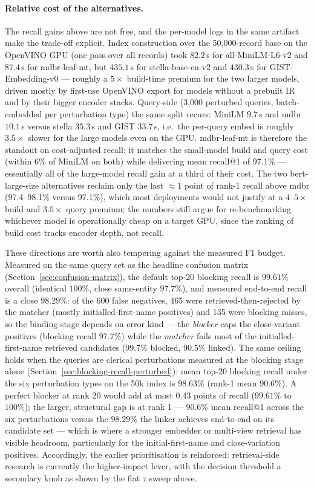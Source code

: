 \documentclass[11pt]{article}
\begin{document}
\paragraph{Relative cost of the alternatives.}
The recall gains above are not free, and the per-model logs in the same artifact make the trade-off explicit. Index construction over the 50{,}000-record base on the OpenVINO GPU (one pass over all records) took $82.2$\,s for all-MiniLM-L6-v2 and $87.4$\,s for mdbr-leaf-mt, but $435.1$\,s for stella-base-en-v2 and $430.3$\,s for GIST-Embedding-v0 --- roughly a $5\times$ build-time premium for the two larger models, driven mostly by first-use OpenVINO export for models without a prebuilt IR and by their bigger encoder stacks. Query-side (3,000 perturbed queries, batch-embedded per perturbation type) the same split recurs: MiniLM $9.7$\,s and mdbr $10.1$\,s versus stella $35.3$\,s and GIST $33.7$\,s, i.e.\ the per-query embed is roughly $3.5\times$ slower for the large models even on the GPU. mdbr-leaf-mt is therefore the standout on cost-adjusted recall: it matches the small-model build and query cost (within 6\% of MiniLM on both) while delivering mean recall@1 of 97.1\% --- essentially all of the large-model recall gain at a third of their cost. The two bert-large-size alternatives reclaim only the last $\approx 1$ point of rank-1 recall above mdbr (97.4--98.1\% versus 97.1\%), which most deployments would not justify at a $4\text{--}5\times$ build and $3.5\times$ query premium; the numbers still argue for re-benchmarking whichever model is operationally cheap on a target GPU, since the ranking of build cost tracks encoder depth, not recall.

These directions are worth also tempering against the measured F1 budget. Measured on the same query set as the headline confusion matrix (Section~\ref{sec:confusion-matrix}), the default top-20 blocking recall is $99.61\%$ overall (identical $100\%$, close same-entity $97.7\%$), and measured end-to-end recall is a close $98.29\%$: of the 600 false negatives, 465 were retrieved-then-rejected by the matcher (mostly initialled-first-name positives) and 135 were blocking misses, so the binding stage depends on error kind --- the \emph{blocker} caps the close-variant positives (blocking recall 97.7\%) while the \emph{matcher} fails most of the initialled-first-name retrieved candidates (99.7\% blocked, 90.5\% linked). The same ceiling holds when the queries are clerical perturbations measured at the blocking stage alone (Section~\ref{sec:blocking-recall-perturbed}): mean top-20 blocking recall under the six perturbation types on the 50k index is $98.63\%$ (rank-1 mean $90.6\%$). A perfect blocker at rank 20 would add at most $0.43$ points of recall ($99.61\%$ to $100\%$); the larger, structural gap is at rank 1 --- $90.6\%$ mean recall@1 across the six perturbations versus the $98.29\%$ the linker achieves end-to-end on its candidate set --- which is where a stronger embedder or multi-view retrieval has visible headroom, particularly for the initial-first-name and close-variation positives. Accordingly, the earlier prioritisation is reinforced: retrieval-side research is currently the higher-impact lever, with the decision threshold a secondary knob as shown by the flat $\tau$ sweep above.
\end{document}
